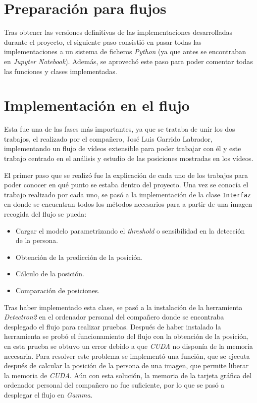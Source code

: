 {\section{Preparación para flujos}
Tras obtener las versiones definitivas de las implementaciones desarrolladas durante el proyecto, el siguiente paso consistió en pasar todas las implementaciones a un sistema de ficheros \textit{Python} (ya que antes se encontraban en \textit{Jupyter Notebook}). Además, se aprovechó este paso para poder comentar todas las funciones y clases implementadas.

\section{Implementación en el flujo}
Esta fue una de las fases más importantes, ya que se trataba de unir los dos trabajos, el realizado por el compañero, José Luis Garrido Labrador, implementando un flujo de vídeos extensible para poder trabajar con él y este trabajo centrado en el análisis y estudio de las posiciones mostradas en los vídeos.

El primer paso que se realizó fue la explicación de cada uno de los trabajos para poder conocer en qué punto se estaba dentro del proyecto. Una vez se conocía el trabajo realizado por cada uno, se pasó a la implementación de la clase \texttt{Interfaz} en donde se encuentran todos los métodos necesarios para a partir de una imagen recogida del flujo se pueda:
\begin{itemize}
	\item Cargar el modelo parametrizando el \textit{threshold} o sensibilidad en la detección de la persona.
	\item Obtención de la predicción de la posición.
	\item Cálculo de la posición.
	\item Comparación de posiciones.
\end{itemize}

Tras haber implementado esta clase, se pasó a la instalación de la herramienta \textit{Detectron2} en el ordenador personal del compañero donde se encontraba desplegado el flujo para realizar pruebas. Después de haber instalado la herramienta se probó el funcionamiento del flujo con la obtención de la posición, en esta prueba se obtuvo un error debido a que \textit{CUDA} no disponía de la memoria necesaria. Para resolver este problema se implementó una función, que se ejecuta después de calcular la posición de la persona de una imagen, que permite liberar la memoria de \textit{CUDA}. Aún con esta solución, la memoria de la tarjeta gráfica del ordenador personal del compañero no fue suficiente, por lo que se pasó a desplegar el flujo en \textit{Gamma}.

}
